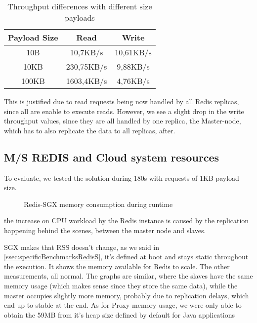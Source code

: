 \begin{table}[ht]
	\caption{Throughput differences with different size payloads} %
	\centering %
	\begin{tabular}{c c c} %
		\hline\hline %
		\textbf{Payload Size} & \textbf{Read} & \textbf{Write} \\ [0.5ex] %
		\hline
		10B & 10,7KB/s & 10,61KB/s\\
		\hline
		10KB & 230,75KB/s & 9,88KB/s \\
		\hline %
		100KB & 1603,4KB/s & 4,76KB/s\\ [1ex] %
		\hline %
	\end{tabular}
	\label{table:throughputPayloadsMS} %
\end{table} 

This is justified due to read requests being now handled by all Redis replicas, since all are enable to execute reads. However, we see a slight drop in the write throughput values, since they are all handled by one replica, the Master-node, which has to also replicate the data to all replicas, after.


\subsection{M/S REDIS and Cloud system resources}


To evaluate, we tested the solution during 180s with requests of 1KB payload size.  



\begin{figure}[htbp]
	\centering
	\caption{Redis-SGX memory consumption during runtime}
	\label{fig:cpuUsage}
\end{figure}

the increase on CPU workload by the Redis instance is caused by the replication happening behind the scenes, between the master node and slaves.

SGX makes that RSS doesn't change, as we said in \ref{ssec:specificBenchmarksRedisS}, it's defined at boot and stays static throughout the execution. It shows the memory available for Redis to scale.
The other measurements, all normal.
The graphs are similar, where the slaves have the same memory usage (which makes sense since they store the same data), while the master occupies slightly more memory, probably due to replication delays, which end up to stable at the end.
As for Proxy memory usage, we were only able to obtain the 59MB from it's heap size defined by default for Java applications




